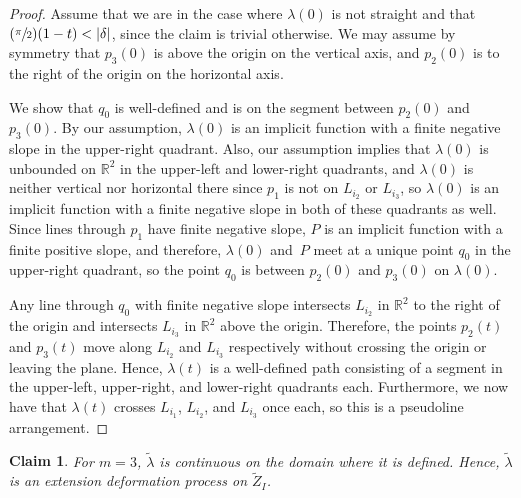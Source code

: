 \documentclass[11pt]{article}
\numberwithin{equation}{section}
\let\nicefrac\sfrac
\newtheorem{claim}[theorem]{Claim}
\theoremstyle{remark}
\let\mb\mathbb
\begin{document}
\begin{proof}
Assume that we are in the case where $\lambda(0)$ is not straight and that \hbox{$(\nicefrac{\pi}{2})(1-t) < |\delta|$}, since the claim is trivial otherwise.
We may assume by symmetry that $p_3(0)$ is above the origin on the vertical axis, and $p_2(0)$ is to the right of the origin on the horizontal axis.

We show that $q_0$ is well-defined and is on the segment between $p_2(0)$ and $p_3(0)$.
By our assumption, $\lambda(0)$ is an implicit function with a finite negative slope in the upper-right quadrant.
Also, our assumption implies that $\lambda(0)$ is unbounded on $\mb{R}^2$ in the upper-left and lower-right quadrants, and $\lambda(0)$ is neither vertical nor horizontal there since $p_1$ is not on $L_{i_2}$ or $L_{i_3}$, so $\lambda(0)$ is an implicit function with a finite negative slope in both of these quadrants as well.
Since lines through $p_1$ have finite negative slope, $P$ is an implicit function with a finite positive slope, and therefore, $\lambda(0)$ and~$P$ meet at a unique point $q_0$ in the upper-right quadrant, so the point $q_0$ is between $p_2(0)$ and $p_3(0)$ on $\lambda(0)$.

Any line through $q_0$ with finite negative slope intersects $L_{i_2}$ in $\mb{R}^2$ to the right of the origin and intersects $L_{i_3}$ in $\mb{R}^2$ above the origin.
Therefore, the points $p_2(t)$ and $p_3(t)$ move along $L_{i_2}$ and $L_{i_3}$ respectively without crossing the origin or leaving the plane.
Hence, $\lambda(t)$ is a well-defined path consisting of a segment in the upper-left, upper-right, and lower-right quadrants each.
Furthermore, we now have that $\lambda(t)$ crosses $L_{i_1}$, $L_{i_2}$, and $L_{i_3}$ once each, so this is a pseudoline arrangement.
\end{proof}

\begin{claim}\label{claim-lambda-continuous-3}
For $m =3$, $\tilde \lambda$ is continuous on the domain where it is defined. Hence, $\tilde \lambda$ is an extension deformation process on $\tilde Z_I$.
\end{claim}
\end{document}
